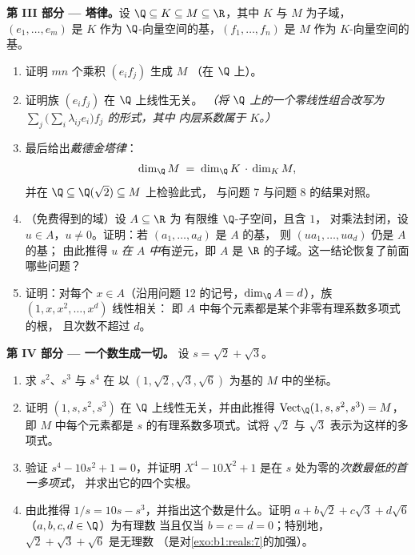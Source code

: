 \begin{problem}
\medskip
\noindent\textbf{第 III 部分 --- 塔律。}设 $\Q \subseteq K
\subseteq M \subseteq \R$，其中 $K$ 与 $M$ 为子域，$(e_1,
\dots, e_m)$ 是 $K$ 作为 $\Q$-向量空间的基，$(f_1,
\dots, f_n)$ 是 $M$ 作为 $K$-向量空间的基。
\begin{enumerate}[resume]
  \item 证明 $mn$ 个乘积 $(e_i f_j)$ 生成 $M$
        （在 $\Q$ 上）。
  \item 证明族 $(e_i f_j)$ 在 $\Q$ 上线性无关。
        \emph{（将 $\Q$ 上的一个零线性组合改写为 $\sum_j
        \bigl(\sum_i \lambda_{ij} e_i\bigr) f_j$ 的形式，其中
        内层系数属于 $K$。）}
  \item 最后给出\emph{戴德金塔律}：
        \[
        \dim_\Q M \;=\; \dim_\Q K \,\cdot\, \dim_K M ,
        \]
        并在 $\Q \subseteq \Q(\sqrt2) \subseteq M$ 上检验此式，
        与问题 7 与问题 8 的结果对照。
  \item （免费得到的域）设 $A \subseteq \R$ 为
        有限维 $\Q$-子空间，且含 $1$，
        对乘法封闭，设 $u \in A$，$u \neq
        0$。证明：若 $(a_1, \dots, a_d)$ 是 $A$ 的基，
        则 $(u a_1, \dots, u a_d)$ 仍是 $A$ 的基；
        由此推得 $u$ \emph{在 $A$ 中}有逆元，即 $A$ 是
        $\R$ 的子域。这一结论恢复了前面
        哪些问题？
  \item 证明：对每个 $x \in A$（沿用问题 12 的记号，$\dim_\Q
        A = d$），族 $(1, x, x^2, \dots, x^{d})$ 线性相关：
        即 $A$ 中每个元素都是某个非零有理系数多项式的根，
        且次数不超过 $d$。
\end{enumerate}

\medskip
\noindent\textbf{第 IV 部分 --- 一个数生成一切。}
设 $s = \sqrt2 + \sqrt3$。
\begin{enumerate}[resume]
  \item 求 $s^2$、$s^3$ 与 $s^4$ 在
        以 $(1, \sqrt2, \sqrt3, \sqrt6)$ 为基的 $M$ 中的坐标。
  \item 证明 $(1, s, s^2, s^3)$ 在 $\Q$ 上线性无关，并由此推得
        $\operatorname{Vect}_\Q(1, s, s^2, s^3) = M$，
        即 $M$ 中每个元素都是 $s$ 的有理系数多项式。试将
        $\sqrt2$ 与 $\sqrt3$ 表示为这样的多项式。
  \item 验证 $s^4 - 10s^2 + 1 = 0$，并证明 $X^4 - 10X^2
        + 1$ 是在 $s$ 处为零的\emph{次数最低的首一多项式}，
        并求出它的四个实根。
  \item 由此推得 $1/s = 10s - s^3$，并指出这个数是什么。证明
        $a + b\sqrt2 + c\sqrt3 + d\sqrt6$（$a,b,c,d \in \Q$）为有理数
        当且仅当 $b = c = d = 0$；特别地，
        $\sqrt2 + \sqrt3 + \sqrt6$ 是无理数
        （是对\cref{exo:b1:reals:7}的加强）。
\end{enumerate}


\end{problem}
